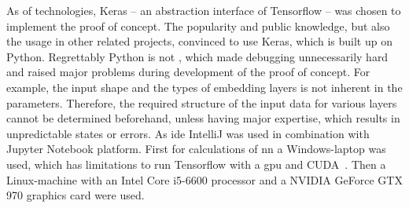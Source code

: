 As of technologies, Keras -- an abstraction interface of Tensorflow -- was chosen to implement the proof of concept.
The popularity and public knowledge, but also the usage in other related projects, convinced to use Keras, which is built up on Python.
Regrettably Python is not , which made debugging unnecessarily hard and raised major problems during development of the proof of concept.
For example, the input shape and the types of embedding layers is not inherent in the parameters.
Therefore, the required structure of the input data for various layers cannot be determined beforehand, unless having major expertise, which results in unpredictable states or errors.
As \gls{ide} IntelliJ was used in combination with Jupyter Notebook platform.
First for calculations of \gls{nn} a Windows-laptop was used, which has limitations to run Tensorflow with a \gls{gpu} and CUDA~\cite{tensorflowGpuWindows}.
Then a Linux-machine with an Intel Core i5-6600 processor and a NVIDIA GeForce GTX 970 graphics card were used.

%







